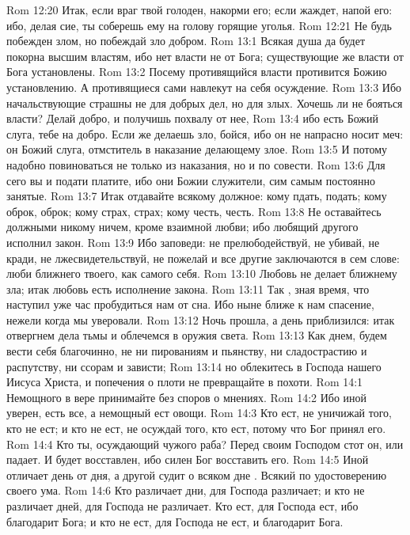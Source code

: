 \vs Rom 12:20 Итак, если враг твой голоден, накорми его; если жаждет, напой его: ибо, делая сие, ты соберешь ему на голову горящие уголья.
\vs Rom 12:21 Не будь побежден злом, но побеждай зло добром.
\vs Rom 13:1 Всякая душа да будет покорна высшим властям, ибо нет власти не от Бога; существующие же власти от Бога установлены.
\vs Rom 13:2 Посему противящийся власти противится Божию установлению. А противящиеся сами навлекут на себя осуждение.
\vs Rom 13:3 Ибо начальствующие страшны не для добрых дел, но для злых. Хочешь ли не бояться власти? Делай добро, и получишь похвалу от нее,
\vs Rom 13:4 ибо  есть Божий слуга, тебе на добро. Если же делаешь зло, бойся, ибо он не напрасно носит меч: он Божий слуга, отмститель в наказание делающему злое.
\vs Rom 13:5 И потому надобно повиноваться не только из  наказания, но и по совести.
\vs Rom 13:6 Для сего вы и подати платите, ибо они Божии служители, сим самым постоянно занятые.
\vs Rom 13:7 Итак отдавайте всякому должное: кому пдать, подать; кому оброк, оброк; кому страх, страх; кому честь, честь.
\rsbpar\vs Rom 13:8 Не оставайтесь должными никому ничем, кроме взаимной любви; ибо любящий другого исполнил закон.
\vs Rom 13:9 Ибо заповеди: не прелюбодействуй, не убивай, не кради, не лжесвидетельствуй, не пожелай  и все другие заключаются в сем слове: люби ближнего твоего, как самого себя.
\vs Rom 13:10 Любовь не делает ближнему зла; итак любовь есть исполнение закона.
\rsbpar\vs Rom 13:11 Так , зная время, что наступил уже час пробудиться нам от сна. Ибо ныне ближе к нам спасение, нежели когда мы уверовали.
\vs Rom 13:12 Ночь прошла, а день приблизился: итак отвергнем дела тьмы и облечемся в оружия света.
\vs Rom 13:13 Как днем, будем вести себя благочинно, не  ни пированиям и пьянству, ни сладострастию и распутству, ни ссорам и зависти;
\vs Rom 13:14 но облекитесь в Господа нашего Иисуса Христа, и попечения о плоти не превращайте в похоти.
\vs Rom 14:1 Немощного в вере принимайте без споров о мнениях.
\vs Rom 14:2 Ибо иной уверен,  есть все, а немощный ест овощи.
\vs Rom 14:3 Кто ест, не уничижай того, кто не ест; и кто не ест, не осуждай того, кто ест, потому что Бог принял его.
\vs Rom 14:4 Кто ты, осуждающий чужого раба? Перед своим Господом стот он, или падает. И будет восставлен, ибо силен Бог восставить его.
\vs Rom 14:5 Иной отличает день от дня, а другой судит о всяком дне . Всякий  по удостоверению своего ума.
\vs Rom 14:6 Кто различает дни, для Господа различает; и кто не различает дней, для Господа не различает. Кто ест, для Господа ест, ибо благодарит Бога; и кто не ест, для Господа не ест, и благодарит Бога.
